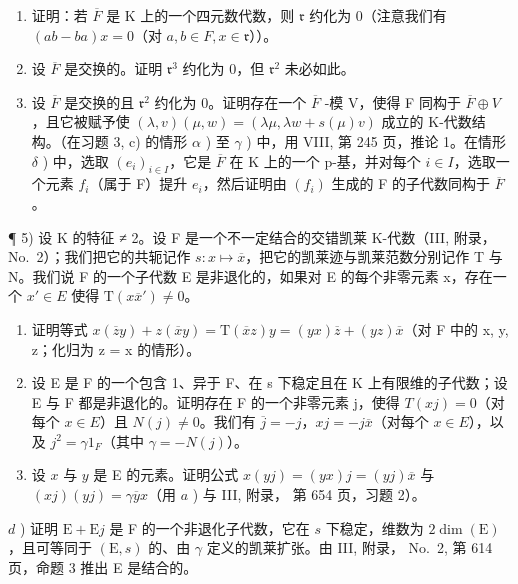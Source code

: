 \begin{enumerate}
\def\labelenumi{\alph{enumi})}
\setcounter{enumi}{1}
\item
  证明：若 \(\overline{F}\) 是 K 上的一个四元数代数，则 \(\mathfrak{r}\) 约化为 0（注意我们有 \((ab - ba)x = 0\)（对 \(a, b \in F, x \in \mathfrak{r}\)））。
\item
  设 \(\overline{F}\) 是交换的。证明 \(\mathfrak{r}^{3}\) 约化为 0，但 \(\mathfrak{r}^{2}\) 未必如此。
\item
  设 \(\overline{F}\) 是交换的且 \(\mathfrak{r}^{2}\) 约化为 0。证明存在一个 \(\overline{F}\) -模 V，使得 F 同构于 \(\overline{F} \oplus V\)，且它被赋予使 \((\lambda, v)(\mu, w) = (\lambda \mu, \lambda w + s(\mu) v)\) 成立的 K-代数结构。（在习题 3, c) 的情形 \(\alpha\) ) 至 \(\gamma\) ) 中，用 VIII, 第 245 页，推论 1。在情形 \(\delta\) ) 中，选取 \((e_{i})_{i \in I}\)，它是 \(\overline{F}\) 在 K 上的一个 p-基，并对每个 \(i \in I\)，选取一个元素 \(f_{i}\)（属于 F）提升 \(e_{i}\)，然后证明由 \((f_{i})\) 生成的 F 的子代数同构于 \(\overline{F}\)。
\end{enumerate}

¶ 5) 设 K 的特征 ≠ 2。设 F 是一个不一定结合的交错凯莱 K-代数（III, 附录， No.~2）；我们把它的共轭记作 \(s : x \mapsto \overline{x}\)，把它的凯莱迹与凯莱范数分别记作 T 与 N。我们说 F 的一个子代数 E 是非退化的，如果对 E 的每个非零元素 x，存在一个 \(x' \in E\) 使得 \(\mathrm{T}(x\overline{x}') \neq 0\)。

\begin{enumerate}
\def\labelenumi{\alph{enumi})}
\item
  证明等式 \(x(\overline{z}y) + z(\overline{x}y) = \mathrm{T}(\overline{x}z)y = (yx)\overline{z} + (yz)\overline{x}\)（对 F 中的 x, y, z；化归为 z = x 的情形）。
\item
  设 E 是 F 的一个包含 1、异于 F、在 s 下稳定且在 K 上有限维的子代数；设 E 与 F 都是非退化的。证明存在 F 的一个非零元素 j，使得 \(T(xj) = 0\)（对每个 \(x \in E\)）且 \(N(j) \neq 0\)。我们有 \(\overline{j} = -j\)，\(xj = -j\overline{x}\)（对每个 \(x \in E\)），以及 \(j^{2} = \gamma1_{F}\)（其中 \(\gamma = -N(j)\)）。
\item
  设 \(x\) 与 \(y\) 是 E 的元素。证明公式 \(x(yj) = (yx)j = (yj)\overline{x}\) 与 \((xj)(yj) = \gamma \overline{y}x\)（用 \(a\) ) 与 III, 附录， 第 654 页，习题 2）。
\end{enumerate}

\(d\) ) 证明 \(\mathrm{E} + \mathrm{E}j\) 是 F 的一个非退化子代数，它在 \(s\) 下稳定，维数为 \(2\dim (\mathrm{E})\)，且可等同于 \((\mathrm{E},s)\) 的、由 \(\gamma\) 定义的凯莱扩张。由 III, 附录， No.~2, 第 614 页，命题 3 推出 E 是结合的。

